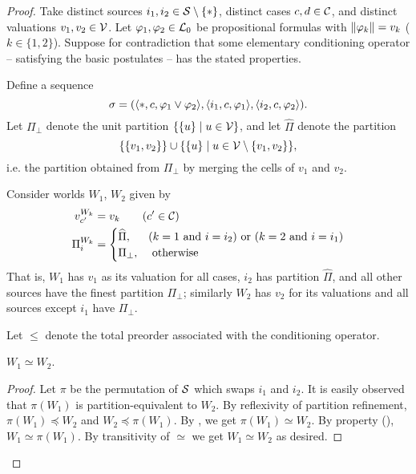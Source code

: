 \begin{proof}
    Take distinct sources $i_1, i_2 \in \mathcal{S} \setminus \{\ast\}$, distinct cases
    $c, d \in \mathcal{C}$, and distinct valuations $v_1, v_2 \in \mathcal{V}$. Let $\varphi_1,
    \varphi_2 \in \mathcal{L}{}_0$ be propositional formulas with $\|{\varphi_k}\| = v_k$
    ($k \in \{1, 2\}$). Suppose for contradiction that some elementary
    conditioning operator -- satisfying the basic postulates -- has the stated
    properties.

    Define a sequence
    \[
        \sigma
        = (
            \langle {\ast, c, \varphi_1 \lor \varphi_2} \rangle,
            \langle {i_1, c, \varphi_1} \rangle,
            \langle {i_2, c, \varphi_2} \rangle
        ).
    \]
    Let $\Pi_\bot$ denote the unit partition $\{\{u\} \mid u \in \mathcal{V}\}$, and
    let $\widehat{\Pi}$ denote the partition
    \[
         \{\{v_1, v_2\}\}
         \cup
         \{\{u\} \mid u \in \mathcal{V} \setminus \{v_1, v_2\}\},
    \]
    i.e. the partition obtained from $\Pi_\bot$ by merging the cells of $v_1$
    and $v_2$.

    Consider worlds $W_1$, $W_2$ given by
    \begin{align*}
         v^{W_k}_{c'} &= v_k \qquad (c' \in \mathcal{C}) \\
         \Pi^{W_k}_i &= \begin{cases}
            \widehat{\Pi},&
                (k = 1 \text{ and } i = i_2)
                \text { or }
                (k = 2 \text{ and } i = i_1) \\
            \Pi_\bot,& \text{ otherwise }
         \end{cases}
    \end{align*}
    That is, $W_1$ has $v_1$ as its valuation for all cases, $i_2$ has
    partition $\widehat{\Pi}$, and all other sources have the finest partition
    $\Pi_\bot$; similarly $W_2$ has $v_2$ for its valuations and all sources
    except $i_1$ have $\Pi_\bot$.

    Let $\le$ denote the total preorder associated with the conditioning
    operator.

        \begin{claim}
            \label{kr_claim_w1_simeq_w2}
            $W_1 \simeq W_2$.
        \end{claim}
        \begin{proof}
            Let $\pi$ be the permutation of $\mathcal{S}$ which swaps $i_1$ and $i_2$.
            It is easily observed that $\pi(W_1)$ is partition-equivalent to
            $W_2$. By reflexivity of partition refinement, $\pi(W_1) \preceq
            W_2$ and $W_2 \preceq \pi(W_1)$. By , we get $\pi(W_1)
            \simeq W_2$. By property (), $W_1 \simeq
            \pi(W_1)$. By transitivity of ${\simeq}$ we get $W_1 \simeq W_2$ as
            desired.
        \end{proof}


\end{proof}
